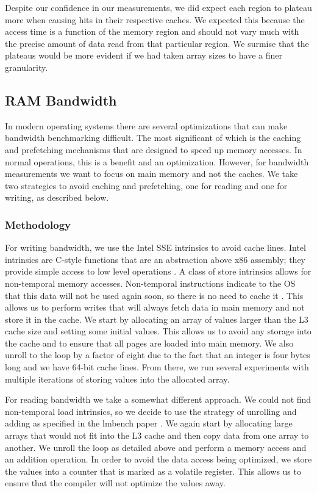 \documentclass[sigconf]{acmart}
\begin{document}
Despite our confidence in our measurements, we did expect each region to plateau more when causing hits in their respective caches. We expected this because the access time is a function of the memory region and should not vary much with the precise amount of data read from that particular region. We surmise that the plateaus would be more evident if we had taken array sizes to have a finer granularity.

\subsection{RAM Bandwidth}
In modern operating systems there are several optimizations that can make bandwidth benchmarking difficult. The most significant of which is the caching and prefetching mechanisms that are designed to speed up memory accesses. In normal operations, this is a benefit and an optimization. However, for bandwidth measurements we want to focus on main memory and not the caches. We take two strategies to avoid caching and prefetching, one for reading and one for writing, as described below.

\subsubsection{Methodology}
For writing bandwidth, we use the Intel SSE intrinsics to avoid cache lines. Intel intrinsics are C-style functions that are an abstraction above x86 assembly; they provide simple access to low level operations \cite{Intel_Intrins}. A class of store intrinsics allows for non-temporal memory accesses. Non-temporal instructions indicate to the OS that this data will not be used again soon, so there is no need to cache it \cite{drepper_2007}. This allows us to perform writes that will always fetch data in main memory and not store it in the cache. We start by allocating an array of values larger than the L3 cache size and setting some initial values. This allows us to avoid any storage into the cache and to ensure that all pages are loaded into main memory. We also unroll to the loop by a factor of eight due to the fact that an integer is four bytes long and we have 64-bit cache lines. From there, we run several experiments with multiple iterations of storing values into the allocated array.

For reading bandwidth we take a somewhat different approach. We could not find non-temporal load intrinsics, so we decide to use the strategy of unrolling and adding as specified in the lmbench paper \cite{Brown:1997:OSB:258623.258690}. We again start by allocating large arrays that would not fit into the L3 cache and then copy data from one array to another. We unroll the loop as detailed above and perform a memory access and an addition operation. In order to avoid the data access being optimized, we store the values into a counter that is marked as a volatile register. This allows us to ensure that the compiler will not optimize the values away.
\end{document}
